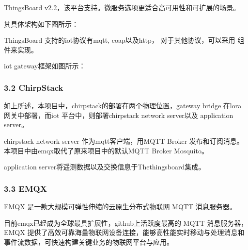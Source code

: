 \documentclass[a4paper,12pt,english]{sphinxmanual}
\begin{document}
\sphinxAtStartPar
{}

\sphinxAtStartPar
ThingsBoard v2.2，该平台支持。微服务选项更适合高可用性和可扩展的场景。

\sphinxAtStartPar
其具体架构如下图所示：

\sphinxAtStartPar
{}

\sphinxAtStartPar
{}

\sphinxAtStartPar
ThingsBoard 支持的iot协议有mqtt, coap以及http， 对于其他协议，可以采用 组件来实现。

\sphinxAtStartPar
iot gateway框架如图所示：

\sphinxAtStartPar
{}


\subsubsection{3.2 ChirpStack}
\label{\detokenize{dev-board/arch:chirpstack}}
\sphinxAtStartPar
如上所述，本项目中，chirpstack的部署在两个物理位置，gateway bridge 在lora网关中部署，而iot 平台中，则部署chirpstack network server以及 application server。

\sphinxAtStartPar
chirpstack network server 作为mqtt客户端，用MQTT Broker 发布和订阅消息。本项目中由emqx取代了原来项目中的默认MQTT Broker Mosquito。

\sphinxAtStartPar
application server将遥测数据以及交换信息于Thethingsboard集成。


\subsubsection{3.3 EMQX}
\label{\detokenize{dev-board/arch:emqx}}
\sphinxAtStartPar
EMQX 是一款大规模可弹性伸缩的云原生分布式物联网 MQTT 消息服务器。

\sphinxAtStartPar
目前emqx已经成为全球最具扩展性，github上活跃度最高的 MQTT 消息服务器，EMQX 提供了高效可靠海量物联网设备连接，能够高性能实时移动与处理消息和事件流数据，可快速构建关键业务的物联网平台与应用。
\end{document}
